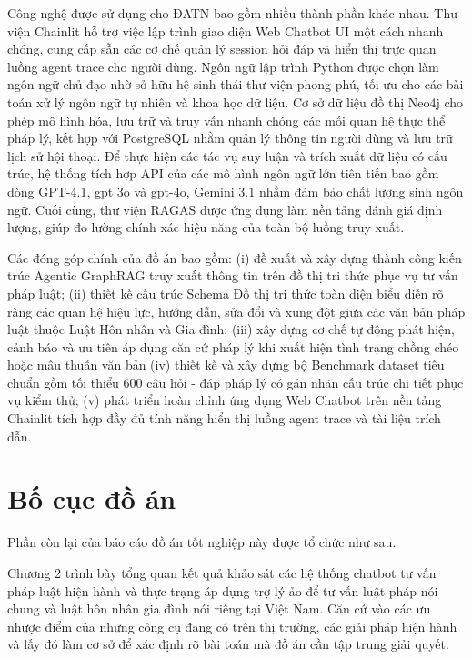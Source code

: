 \documentclass[../DoAn.tex]{subfiles}
\begin{document}
Công nghệ được sử dụng cho ĐATN bao gồm nhiều thành phần khác nhau. Thư viện Chainlit hỗ trợ việc lập trình giao diện Web Chatbot UI một cách nhanh chóng, cung cấp sẵn các cơ chế quản lý session hỏi đáp và hiển thị trực quan luồng agent trace cho người dùng. Ngôn ngữ lập trình Python được chọn làm ngôn ngữ chủ đạo nhờ sở hữu hệ sinh thái thư viện phong phú, tối ưu cho các bài toán xử lý ngôn ngữ tự nhiên và khoa học dữ liệu. Cơ sở dữ liệu đồ thị Neo4j cho phép mô hình hóa, lưu trữ và truy vấn nhanh chóng các mối quan hệ thực thể pháp lý, kết hợp với PostgreSQL nhằm quản lý thông tin người dùng và lưu trữ lịch sử hội thoại. Để thực hiện các tác vụ suy luận và trích xuất dữ liệu có cấu trúc, hệ thống tích hợp API của các mô hình ngôn ngữ lớn tiên tiến bao gồm dòng GPT-4.1, gpt 3o và gpt-4o, Gemini 3.1  nhằm đảm bảo chất lượng sinh ngôn ngữ. Cuối cùng, thư viện RAGAS được ứng dụng làm nền tảng đánh giá định lượng, giúp đo lường chính xác hiệu năng của toàn bộ luồng truy xuất.

Các đóng góp chính của đồ án bao gồm: (i) đề xuất và xây dựng thành công kiến trúc Agentic GraphRAG truy xuất thông tin trên đồ thị tri thức phục vụ tư vấn pháp luật;  (ii) thiết kế cấu trúc Schema Đồ thị tri thức toàn diện biểu diễn rõ ràng các quan hệ hiệu lực, hướng dẫn, sửa đổi và xung đột giữa các văn bản pháp luật thuộc Luật Hôn nhân và Gia đình; (iii) xây dựng cơ chế tự động phát hiện, cảnh báo và ưu tiên áp dụng căn cứ pháp lý khi xuất hiện tình trạng chồng chéo hoặc mâu thuẫn văn bản (iv) thiết kế và xây dựng bộ Benchmark dataset tiêu chuẩn gồm tối thiểu 600 câu hỏi - đáp pháp lý có gán nhãn cấu trúc chi tiết phục vụ kiểm thử; (v) phát triển hoàn chỉnh ứng dụng Web Chatbot trên nền tảng Chainlit tích hợp đầy đủ tính năng hiển thị luồng agent trace và tài liệu trích dẫn.

\section{Bố cục đồ án}
\label{section:1.4}

Phần còn lại của báo cáo đồ án tốt nghiệp này được tổ chức như sau.

Chương 2 trình bày tổng quan kết quả khảo sát các hệ thống chatbot tư vấn pháp luật hiện hành và thực trạng áp dụng trợ lý ảo để tư vấn luật pháp nói chung và luật hôn nhân gia đình nói riêng tại Việt Nam. Căn cứ vào các ưu nhược điểm của những công cụ đang có trên thị trường, các giải pháp hiện hành và lấy đó làm cơ sở để xác định rõ bài toán mà đồ án cần tập trung giải quyết.
\end{document}
